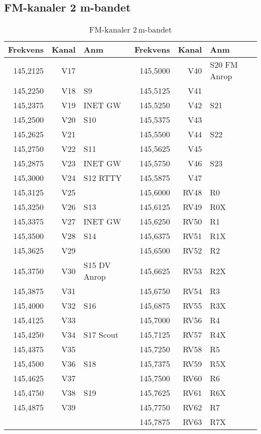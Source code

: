 \subsection{FM-kanaler 2 m-bandet}

\begin{longtable}{rrl|rrl}
\caption{FM-kanaler 2\,m-bandet}\\
\textbf{Frekvens} & \textbf{Kanal} & \textbf{Anm} &
\textbf{Frekvens} & \textbf{Kanal} & \textbf{Anm} \\ \hline

145,2125 & V17 &              & 145,5000 & V40  & S20  FM Anrop \\
145,2250 & V18 & S9           & 145,5125 & V41  &               \\
145,2375 & V19 & INET GW      & 145,5250 & V42  & S21           \\
145,2500 & V20 & S10          & 145,5375 & V43  &               \\
145,2625 & V21 &              & 145,5500 & V44  & S22           \\
145,2750 & V22 & S11          & 145,5625 & V45  &               \\
145,2875 & V23 & INET GW      & 145,5750 & V46  & S23           \\
145,3000 & V24 & S12  RTTY    & 145,5875 & V47  &               \\
145,3125 & V25 &              & 145,6000 & RV48 & R0            \\
145,3250 & V26 & S13          & 145,6125 & RV49 & R0X           \\
145,3375 & V27 & INET GW      & 145,6250 & RV50 & R1            \\
145,3500 & V28 & S14          & 145,6375 & RV51 & R1X           \\
145,3625 & V29 &              & 145,6500 & RV52 & R2            \\
145,3750 & V30 & S15 DV Anrop & 145,6625 & RV53 & R2X           \\
145,3875 & V31 &              & 145,6750 & RV54 & R3            \\
145,4000 & V32 & S16          & 145,6875 & RV55 & R3X           \\
145,4125 & V33 &              & 145,7000 & RV56 & R4            \\
145,4250 & V34 & S17 Scout    & 145,7125 & RV57 & R4X           \\
145,4375 & V35 &              & 145,7250 & RV58 & R5            \\
145,4500 & V36 & S18          & 145,7375 & RV59 & R5X           \\
145,4625 & V37 &              & 145,7500 & RV60 & R6            \\
145,4750 & V38 & S19          & 145,7625 & RV61 & R6X           \\
145,4875 & V39 &              & 145,7750 & RV62 & R7            \\
         &     &              & 145,7875 & RV63 & R7X
\end{longtable}

